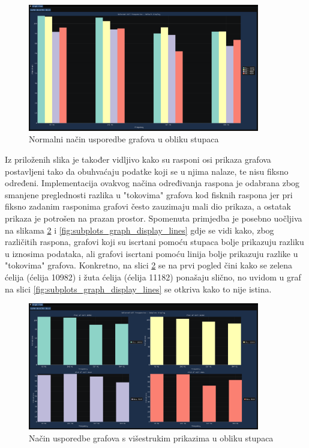 \documentclass[times, utf8, diplomski]{fer}
\begin{document}
\begin{figure}[H]
	\centering
	\includegraphics[width=0.9\textwidth]{default_graph_display_bars.png}
	\caption{Normalni način usporedbe grafova u obliku stupaca}
    \label{fig:default_graph_display_bars}
\end{figure}

Iz priloženih slika je također vidljivo kako su rasponi osi prikaza grafova postavljeni tako da obuhvaćaju podatke koji se u njima nalaze, te nisu fiksno određeni. Implementacija ovakvog načina određivanja raspona je odabrana zbog smanjene preglednosti razlika u "tokovima" grafova kod fisknih raspona jer pri fiksno zadanim rasponima grafovi često zauzimaju mali dio prikaza, a ostatak prikaza je potrošen na prazan prostor. Spomenuta primjedba je posebno uočljiva na slikama \ref{fig:subplots_graph_display_bars} i \ref{fig:subplots_graph_display_lines} gdje se vidi kako, zbog različitih raspona, grafovi koji su iscrtani pomoću stupaca bolje prikazuju razliku u iznosima podataka, ali grafovi iscrtani pomoću linija bolje prikazuju razlike u "tokovima" grafova. Konkretno, na slici \ref{fig:subplots_graph_display_bars} se na prvi pogled čini kako se zelena ćelija (ćelija 10982) i žuta ćelija (ćelija 11182) ponašaju slično, no uvidom u graf na slici \ref{fig:subplots_graph_display_lines} se otkriva kako to nije istina.

\begin{figure}[H]
	\centering
	\includegraphics[width=0.9\textwidth]{subplots_graph_display_bars.png}
	\caption{Način usporedbe grafova s višestrukim prikazima u obliku stupaca}
    \label{fig:subplots_graph_display_bars}
\end{figure}
\end{document}
